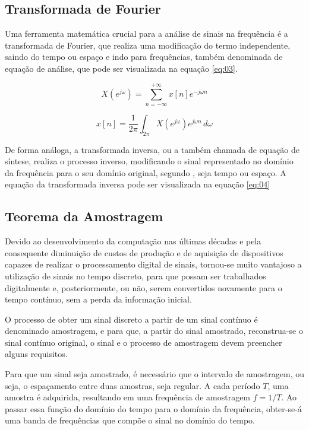 \subsection{Transformada de Fourier}
Uma ferramenta matemática crucial para a análise de sinais na frequência é a transformada de Fourier, que realiza uma modificação do termo independente, saindo do tempo ou espaço e indo para frequências, também denominada de equação de análise, que pode ser visualizada na equação \ref{eq:03}.

\begin{equation}  \label{eq:03}
X(e^{j\omega})= \sum_{n=-\infty}^{+\infty} x[n]e^{-j\omega n}
\end{equation}

\begin{equation}  \label{eq:04}
x[n]=\frac{1}{2\pi} \int_{2\pi}^{} X(e^{j\omega})e^{j\omega n} \,d\omega
\end{equation}

De forma análoga, a transformada inversa, ou a também chamada de equação de síntese, realiza o processo inverso, modificando o sinal representado no domínio da frequência para o seu domínio original, segundo \cite{oppenheim2010sinais}, seja tempo ou espaço. A equação da transformada inversa pode ser visualizada na equação \ref{eq:04}

\subsection{Teorema da Amostragem}
Devido ao desenvolvimento da computação nas últimas décadas e pela consequente diminuição de custos de produção e de aquisição de dispositivos capazes de realizar o processamento digital de sinais, tornou-se muito vantajoso a utilização de sinais no tempo discreto, para que possam ser trabalhados digitalmente e, posteriormente, ou não, serem convertidos novamente para o tempo contínuo, sem a perda da informação inicial. 

O processo de obter um sinal discreto a partir de um sinal contínuo é denominado amostragem, e para que, a partir do sinal amostrado, reconstrua-se o sinal contínuo original, o sinal e o processo de amostragem devem preencher alguns requisitos.

Para que um sinal seja amostrado, é necessário que o intervalo de amostragem, ou seja, o espaçamento entre duas amostras, seja regular. A cada período $T$, uma amostra é adquirida, resultando em uma frequência de amostragem $f = 1/T$. Ao passar essa função do domínio do tempo para o domínio da frequência, obter-se-á uma banda de frequências que compõe o sinal no domínio do tempo.

